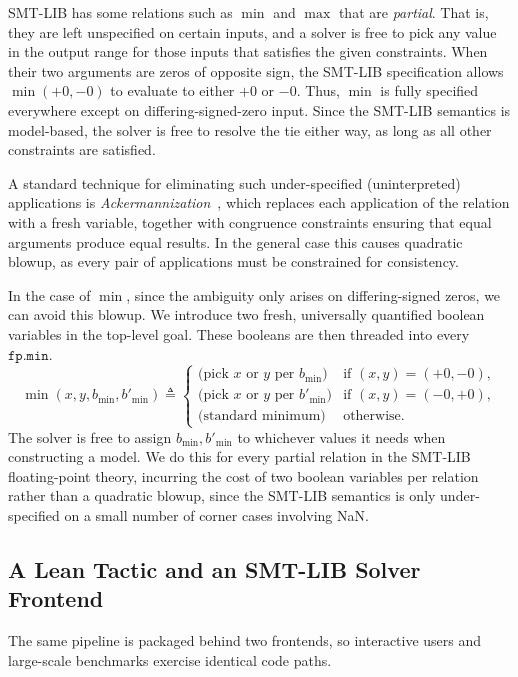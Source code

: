 SMT-LIB has some relations such as $\min$ and $\max$ that are \emph{partial}.
That is, they are left unspecified on certain inputs,
and a solver is free to pick any value in the output range for those inputs that satisfies the given constraints.
When their two arguments are zeros of opposite sign, the SMT-LIB specification
allows $\min(+0, -0)$ to evaluate to either $+0$ or $-0$.
Thus, $\min$ is fully specified everywhere except on
differing-signed-zero input.
Since the SMT-LIB semantics is model-based, the solver is free to resolve the tie either way,
as long as all other constraints are satisfied.

A standard technique for eliminating such under-specified (uninterpreted) applications
is \emph{Ackermannization}~\cite{ackermannization}, which replaces each application of the relation
with a fresh variable, together with congruence constraints ensuring
that equal arguments produce equal results.
In the general case this causes quadratic blowup,
as every pair of applications must be constrained for consistency.

In the case of $\min$, since the ambiguity only arises on differing-signed zeros, we can avoid this blowup.
We introduce two fresh, universally quantified boolean variables in the top-level goal.
These booleans are then threaded into every $\texttt{fp.min}$.
\[
  \min(x, y, b_{\min}, b'_{\min}) \triangleq
  \begin{cases}
    \text{(pick $x$ or $y$ per } b_{\min}) & \text{if } (x, y) = (+0, -0), \\
    \text{(pick $x$ or $y$ per } b'_{\min}) & \text{if } (x, y) = (-0, +0), \\
    \text{(standard minimum)} & \text{otherwise.}
  \end{cases}
\]
The solver is free to assign $b_{\min}, b'_{\min}$ to whichever values it needs when constructing a model.
We do this for every partial relation in the SMT-LIB floating-point theory,
incurring the cost of two boolean variables per relation rather than a quadratic blowup,
since the SMT-LIB semantics is only under-specified on a small number of corner cases involving NaN.

\subsection{A Lean Tactic and an SMT-LIB Solver Frontend}\label{sec:fp:frontends}

The same pipeline is packaged behind two frontends,
so interactive users and large-scale benchmarks exercise identical code paths.

